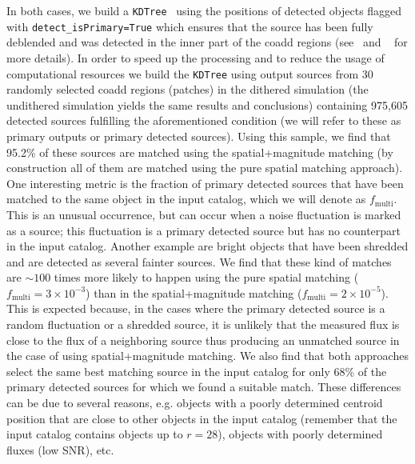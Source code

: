 \documentclass[\docopts]{\docclass}
\begin{document}
In both cases, we build a \texttt{KDTree}~\citep{scikit-learn} using the positions of detected objects flagged with \texttt{detect\_isPrimary=True} which ensures that the source has been fully deblended and was detected in the inner part of the coadd regions (see~\citet{2018PASJ...70S...5B} and ~\citet{2018PASJ...70S..25M} for more details). In order to speed up the processing and to reduce the usage of computational resources we build the \texttt{KDTree} using output sources from 30 randomly selected coadd regions (patches) in the dithered simulation (the undithered simulation yields the same results and conclusions) containing 975,605 detected sources fulfilling the aforementioned condition (we will refer to these as primary outputs or primary detected sources). Using this sample, we find that 95.2\% of these sources are matched using the spatial+magnitude matching (by construction all of them are matched using the pure spatial matching approach). One interesting metric is the fraction of primary detected sources that have been matched to the same object in the input catalog, which we will denote as $f_{\mathrm{multi}}$. This is an unusual occurrence, but can occur when a noise fluctuation is marked as a source; this fluctuation is a primary detected source but has no counterpart in the input catalog. Another example are bright objects that have been shredded and are detected as several fainter sources. We find that these kind of matches are $\sim 100$ times more likely to happen using the pure spatial matching ($f_{\mathrm{multi}} = 3 \times 10^{-3}$) than in the spatial+magnitude matching ($ f_{\mathrm{multi}} = 2 \times 10^{-5}$). This is expected because, in the cases where the primary detected source is a random fluctuation or a shredded source, it is unlikely that the measured flux is close to the flux of a neighboring source thus producing an unmatched source in the case of using spatial+magnitude matching. We also find that both approaches select the same best matching source in the input catalog for only 68\% of the primary detected sources for which we found a suitable match. These differences can be due to several reasons, e.g. objects with a poorly determined centroid position that are close to other objects in the input catalog (remember that the input catalog contains objects up to $r=28$), objects with poorly determined fluxes (low SNR), etc.
\end{document}
